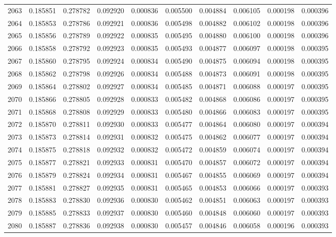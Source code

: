 \begin{tabular}{lrrrrrrrrr}
2063 & 0.185851 & 0.278782 & 0.092920 & 0.000836 & 0.005500 & 0.004884 & 0.006105 & 0.000198 & 0.000396 \\
2064 & 0.185853 & 0.278786 & 0.092921 & 0.000836 & 0.005498 & 0.004882 & 0.006102 & 0.000198 & 0.000396 \\
2065 & 0.185856 & 0.278789 & 0.092922 & 0.000835 & 0.005495 & 0.004880 & 0.006100 & 0.000198 & 0.000396 \\
2066 & 0.185858 & 0.278792 & 0.092923 & 0.000835 & 0.005493 & 0.004877 & 0.006097 & 0.000198 & 0.000395 \\
2067 & 0.185860 & 0.278795 & 0.092924 & 0.000834 & 0.005490 & 0.004875 & 0.006094 & 0.000198 & 0.000395 \\
2068 & 0.185862 & 0.278798 & 0.092926 & 0.000834 & 0.005488 & 0.004873 & 0.006091 & 0.000198 & 0.000395 \\
2069 & 0.185864 & 0.278802 & 0.092927 & 0.000834 & 0.005485 & 0.004871 & 0.006088 & 0.000197 & 0.000395 \\
2070 & 0.185866 & 0.278805 & 0.092928 & 0.000833 & 0.005482 & 0.004868 & 0.006086 & 0.000197 & 0.000395 \\
2071 & 0.185868 & 0.278808 & 0.092929 & 0.000833 & 0.005480 & 0.004866 & 0.006083 & 0.000197 & 0.000395 \\
2072 & 0.185870 & 0.278811 & 0.092930 & 0.000833 & 0.005477 & 0.004864 & 0.006080 & 0.000197 & 0.000394 \\
2073 & 0.185873 & 0.278814 & 0.092931 & 0.000832 & 0.005475 & 0.004862 & 0.006077 & 0.000197 & 0.000394 \\
2074 & 0.185875 & 0.278818 & 0.092932 & 0.000832 & 0.005472 & 0.004859 & 0.006074 & 0.000197 & 0.000394 \\
2075 & 0.185877 & 0.278821 & 0.092933 & 0.000831 & 0.005470 & 0.004857 & 0.006072 & 0.000197 & 0.000394 \\
2076 & 0.185879 & 0.278824 & 0.092934 & 0.000831 & 0.005467 & 0.004855 & 0.006069 & 0.000197 & 0.000394 \\
2077 & 0.185881 & 0.278827 & 0.092935 & 0.000831 & 0.005465 & 0.004853 & 0.006066 & 0.000197 & 0.000393 \\
2078 & 0.185883 & 0.278830 & 0.092936 & 0.000830 & 0.005462 & 0.004851 & 0.006063 & 0.000197 & 0.000393 \\
2079 & 0.185885 & 0.278833 & 0.092937 & 0.000830 & 0.005460 & 0.004848 & 0.006060 & 0.000197 & 0.000393 \\
2080 & 0.185887 & 0.278836 & 0.092938 & 0.000830 & 0.005457 & 0.004846 & 0.006058 & 0.000196 & 0.000393 \\

\end{tabular}
